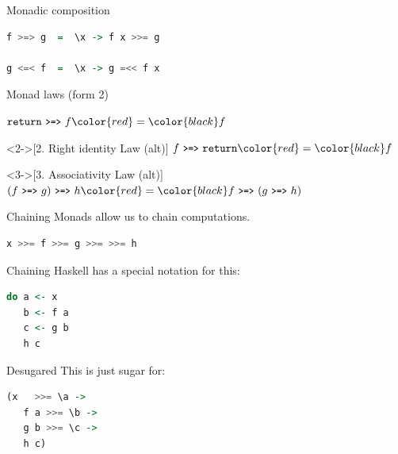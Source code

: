 \documentclass[utf8x,notes,17pt]{beamer}
\begin{document}
\begin{frame}[fragile,label=sec-16-8]{Monadic composition}
\begin{example}[\vspace*{-3.5ex}]
\begin{lstlisting}[language=Haskell]
f >=> g  =  \x -> f x >>= g

g <=< f  =  \x -> g =<< f x
\end{lstlisting}
\end{example}
\end{frame}
\begin{frame}[fragile,label=sec-16-9]{Monad laws (form 2)}
\begin{definition}
\( \texttt{return}\ \text{\texttt{\small >=>}}\ f \color{red}=\color{black} f \)
\end{definition}
\begin{definition}<2->[2. Right identity Law (alt)]
\( f\ \text{\texttt{\small >=>}}\ \texttt{return} \color{red}=\color{black} f \)
\end{definition}
\begin{definition}<3->[3. Associativity Law (alt)]
\( (f\ \text{\texttt{\small >=>}}\ g)\ \text{\texttt{\small >=>}}\ h \color{red}=\color{black} f\ \text{\texttt{\small >=>}}\ (g\ \text{\texttt{\small >=>}}\ h) \)
\end{definition}
\end{frame}
\begin{frame}[fragile,label=sec-16-10]{Chaining}
Monads allow us to chain computations.
\begin{example}[\vspace*{-3.5ex}]
\begin{lstlisting}[language=Haskell]
x >>= f >>= g >>= >>= h
\end{lstlisting}
\end{example}
\end{frame}
\begin{frame}[fragile,label=sec-16-11]{Chaining}
Haskell has a special notation for this:
\begin{example}[\vspace*{-3.5ex}]
\begin{lstlisting}[language=Haskell]
do a <- x
   b <- f a
   c <- g b
   h c
\end{lstlisting}
\end{example}
\end{frame}
\begin{frame}[fragile,label=sec-16-12]{Desugared}
This is just sugar for:
\begin{example}[\vspace*{-3.5ex}]
\begin{lstlisting}[language=Haskell]
  (x   >>= \a ->
   f a >>= \b ->
   g b >>= \c ->
   h c)
\end{lstlisting}
\end{example}
\end{frame}
\end{document}
